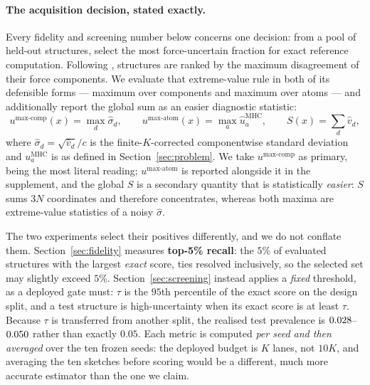 \documentclass{article}
\begin{document}
\paragraph{The acquisition decision, stated exactly.}
\label{par:acq}
Every fidelity and screening number below concerns one decision: from a pool of held-out structures,
select the most force-uncertain fraction for exact reference computation. Following
\citet{beck2025mhc}, structures are ranked by the maximum disagreement of their force components. We
evaluate that extreme-value rule in both of its defensible forms --- maximum over components and
maximum over atoms --- and additionally report the global sum as an easier diagnostic statistic:
\begin{equation}
u^{\max\text{-comp}}(x)=\max_{d}\widehat\sigma_d,\qquad
u^{\max\text{-atom}}(x)=\max_{a}\widehat u_a^{\mathrm{MHC}},\qquad
S(x)=\sum_{d}\widehat v_d ,
\end{equation}
where $\widehat\sigma_d=\sqrt{\widehat v_d}/c$ is the finite-$K$-corrected componentwise standard
deviation and $u_a^{\mathrm{MHC}}$ is as defined in Section~\ref{sec:problem}. We take
$u^{\max\text{-comp}}$ as primary, being the most literal reading; $u^{\max\text{-atom}}$ is reported
alongside it in the supplement, and the global $S$ is a secondary quantity that is statistically
\emph{easier}: $S$ sums $3N$ coordinates and therefore concentrates, whereas both maxima are
extreme-value statistics of a noisy $\widehat\sigma$.

The two experiments select their positives differently, and we do not conflate them.
Section~\ref{sec:fidelity} measures \textbf{top-5\% recall}: the $5\%$ of evaluated structures with
the largest \emph{exact} score, ties resolved inclusively, so the selected set may slightly exceed
$5\%$. Section~\ref{sec:screening} instead applies a \emph{fixed} threshold, as a deployed gate must:
$\tau$ is the $95$th percentile of the exact score on the design split, and a test structure is
high-uncertainty when its exact score is at least $\tau$. Because $\tau$ is transferred from another
split, the realised test prevalence is $0.028$--$0.050$ rather than
exactly $0.05$. Each metric is computed \emph{per seed and then averaged} over the ten frozen
seeds: the deployed budget is $K$ lanes, not $10K$, and averaging the ten sketches before scoring
would be a different, much more accurate estimator than the one we claim.
\end{document}
